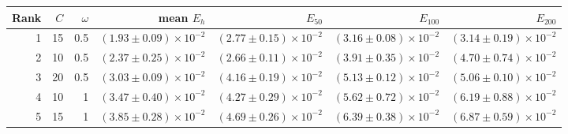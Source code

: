 \begin{tabular}{rrrrrrr}
\toprule
Rank & $C$ & $\omega$ & mean $E_h$ & $E_{50}$ & $E_{100}$ & $E_{200}$ \\
\midrule
1 & 15 & 0.5 & $(1.93 \pm 0.09) \times 10^{-2}$ & $(2.77 \pm 0.15) \times 10^{-2}$ & $(3.16 \pm 0.08) \times 10^{-2}$ & $(3.14 \pm 0.19) \times 10^{-2}$ \\
2 & 10 & 0.5 & $(2.37 \pm 0.25) \times 10^{-2}$ & $(2.66 \pm 0.11) \times 10^{-2}$ & $(3.91 \pm 0.35) \times 10^{-2}$ & $(4.70 \pm 0.74) \times 10^{-2}$ \\
3 & 20 & 0.5 & $(3.03 \pm 0.09) \times 10^{-2}$ & $(4.16 \pm 0.19) \times 10^{-2}$ & $(5.13 \pm 0.12) \times 10^{-2}$ & $(5.06 \pm 0.10) \times 10^{-2}$ \\
4 & 10 & 1 & $(3.47 \pm 0.40) \times 10^{-2}$ & $(4.27 \pm 0.29) \times 10^{-2}$ & $(5.62 \pm 0.72) \times 10^{-2}$ & $(6.19 \pm 0.88) \times 10^{-2}$ \\
5 & 15 & 1 & $(3.85 \pm 0.28) \times 10^{-2}$ & $(4.69 \pm 0.26) \times 10^{-2}$ & $(6.39 \pm 0.38) \times 10^{-2}$ & $(6.87 \pm 0.59) \times 10^{-2}$ \\
\bottomrule
\end{tabular}
